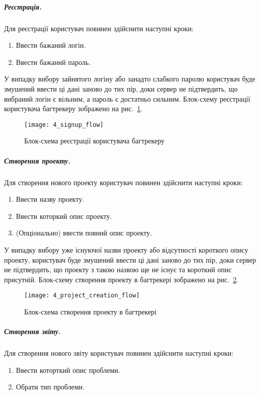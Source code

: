 \documentclass[../main.tex]{subfiles}
\begin{document}
		\subparagraph{Реєстрація.}
			Для реєстрації користувач повинен здійснити наступні кроки:
			\begin{enumerate}
				\item Ввести бажаний логін.
				\item Ввести бажаний пароль.
			\end{enumerate}
			
			У випадку вибору зайнятого логіну або занадто слабкого паролю користувач буде змушений ввести ці дані заново до тих пір, доки сервер не підтвердить, що вибраний логін є вільним, а пароль є достатньо сильним. Блок-схему реєстрації користувача багтрекеру зображено на рис.~\ref{flowchart_signup}.
			
			\begin{figure}[H]
				\centering
				\texttt{[image: 4\_signup\_flow]}
				\caption{Блок-схема реєстрації користувача багтрекеру}
				\label{flowchart_signup}
			\end{figure}
		
		\subparagraph{Створення проекту.}
			Для створення нового проекту користувач повинен здійснити наступні кроки:
			\begin{enumerate}
				\item Ввести назву проекту.
				\item Ввести которкий опис проекту.
				\item (Опціонально) ввести повний опис проекту.
			\end{enumerate}
			
			У випадку вибору уже існуючої назви проекту або відсутності короткого опису проекту, користувач буде змушений ввести ці дані заново до тих пір, доки сервер не підтвердить, що проекту з такою назвою ще не існує та короткий опис присутній. Блок-схему створення проекту в багтрекері зображено на рис.~\ref{flowchart_project_creation}.
			
			\begin{figure}[H]
				\centering
				\texttt{[image: 4\_project\_creation\_flow]}
				\caption{Блок-схема створення проекту в багтрекері}
				\label{flowchart_project_creation}
			\end{figure}
		
		\subparagraph{Створення звіту.}
			Для створення нового звіту користувач повинен здійснити наступні кроки:
			\begin{enumerate}
				\item Ввести которткий опис проблеми.
				\item Обрати тип проблеми.
			\end{enumerate}
			
\end{document}
